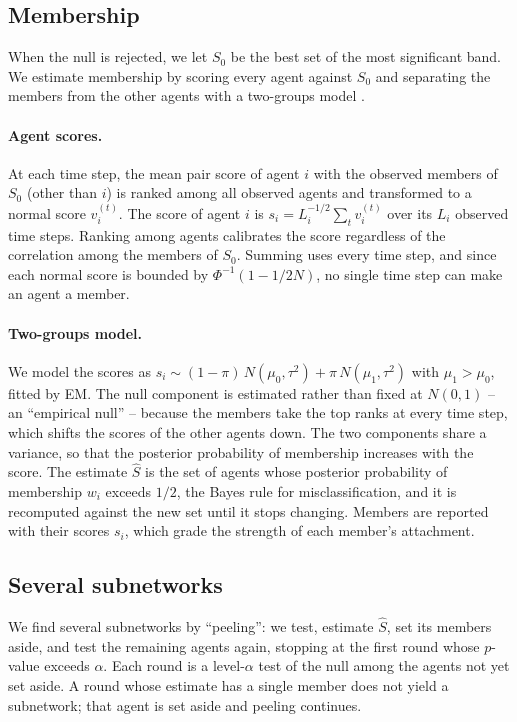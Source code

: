 \documentclass{article}
\theoremstyle{plain}
\theoremstyle{definition}
\begin{document}
\subsection{Membership}
\label{sec:membership}

When the null is rejected, we let $S_0$ be the best set of the most significant band. We estimate membership by scoring every agent against $S_0$ and separating the members from the other agents with a two-groups model \citep{efron2004large}.

\paragraph{Agent scores.} At each time step, the mean pair score of agent $i$ with the observed members of $S_0$ (other than $i$) is ranked among all observed agents and transformed to a normal score $v_i^{(t)}$. The score of agent $i$ is $s_i = L_i^{-1/2}\sum_t v_i^{(t)}$ over its $L_i$ observed time steps. Ranking among agents calibrates the score regardless of the correlation among the members of $S_0$. Summing uses every time step, and since each normal score is bounded by $\Phi^{-1}(1-1/2N)$, no single time step can make an agent a member.

\paragraph{Two-groups model.} We model the scores as $s_i \sim (1-\pi)\,N(\mu_0,\tau^2) + \pi\,N(\mu_1,\tau^2)$ with $\mu_1>\mu_0$, fitted by EM. The null component is estimated rather than fixed at $N(0,1)$ -- an ``empirical null'' -- because the members take the top ranks at every time step, which shifts the scores of the other agents down. The two components share a variance, so that the posterior probability of membership increases with the score. The estimate $\hat S$ is the set of agents whose posterior probability of membership $w_i$ exceeds $1/2$, the Bayes rule for misclassification, and it is recomputed against the new set until it stops changing. Members are reported with their scores $s_i$, which grade the strength of each member's attachment.

\subsection{Several subnetworks}
\label{sec:peel}

We find several subnetworks by ``peeling'': we test, estimate $\hat S$, set its members aside, and test the remaining agents again, stopping at the first round whose $p$-value exceeds $\alpha$. Each round is a level-$\alpha$ test of the null among the agents not yet set aside. A round whose estimate has a single member does not yield a subnetwork; that agent is set aside and peeling continues.
\end{document}
